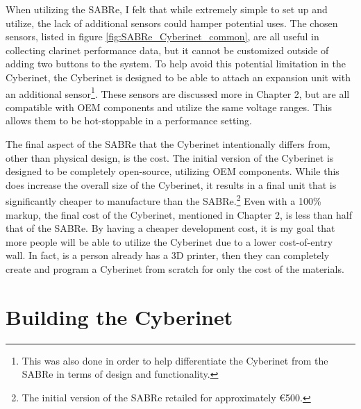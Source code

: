 When utilizing the SABRe, I felt that while extremely simple to set up and utilize, the lack of additional sensors could hamper potential uses. The chosen sensors, listed in figure \ref{fig:SABRe_Cyberinet_common}, are all useful in collecting clarinet performance data, but it cannot be customized outside of adding two buttons to the system. To help avoid this potential limitation in the Cyberinet, the Cyberinet is designed to be able to attach an expansion unit with an additional sensor\footnote{This was also done in order to help differentiate the Cyberinet from the SABRe in terms of design and functionality.}. These sensors are discussed more in Chapter 2, but are all compatible with OEM components and utilize the same voltage ranges. This allows them to be hot-stoppable in a performance setting.

The final aspect of the SABRe that the Cyberinet intentionally differs from, other than physical design, is the cost. The initial version of the Cyberinet is designed to be completely open-source, utilizing OEM components. While this does increase the overall size of the Cyberinet, it results in a final unit that is significantly cheaper to manufacture than the SABRe.\footnote{The initial version of the SABRe retailed for approximately €500.} Even with a 100\% markup, the final cost of the Cyberinet, mentioned in Chapter 2, is less than half that of the SABRe. By having a cheaper development cost, it is my goal that more people will be able to utilize the Cyberinet due to a lower cost-of-entry wall. In fact, is a person already has a 3D printer, then they can completely create and program a Cyberinet from scratch for only the cost of the materials.







\chapter{Building the Cyberinet}




